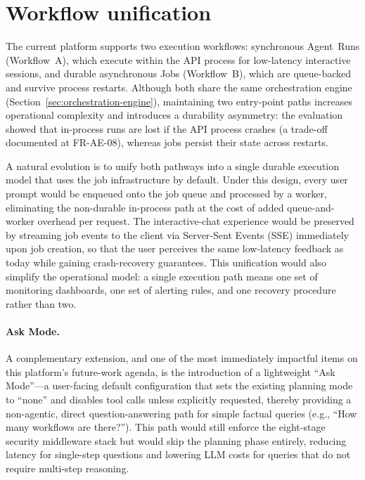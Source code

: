 \documentclass[a4paper,noexaminfo]{sapthesis}
\begin{document}
\section{Workflow unification}
\label{sec:fw-workflow}

The current platform supports two execution workflows: synchronous
Agent~Runs (Workflow~A), which execute within the API process for
low-latency interactive sessions, and durable asynchronous Jobs
(Workflow~B), which are queue-backed and survive process restarts.
Although both share the same orchestration engine
(Section~\ref{sec:orchestration-engine}), maintaining two entry-point
paths increases operational complexity and introduces a durability
asymmetry: the evaluation showed that in-process runs are lost if the API
process crashes (a trade-off documented at FR-AE-08), whereas jobs
persist their state across restarts.

A natural evolution is to unify both pathways into a single durable
execution model that uses the job infrastructure by default.  Under this
design, every user prompt would be enqueued onto the job queue and
processed by a worker, eliminating the non-durable in-process path at
the cost of added queue-and-worker overhead per request.  The
interactive-chat experience would be preserved by streaming job events
to the client via Server-Sent Events (SSE) immediately upon job creation,
so that the user perceives the same low-latency feedback as today while
gaining crash-recovery guarantees.  This unification would also simplify
the operational model: a single execution path means one set of monitoring
dashboards, one set of alerting rules, and one recovery procedure rather
than two.

\paragraph{Ask Mode.}
A complementary extension, and one of the most immediately impactful
items on this platform's future-work agenda, is the introduction of a
lightweight ``Ask Mode''---a user-facing default configuration that sets
the existing planning mode to ``none'' and disables tool calls unless
explicitly requested, thereby providing a non-agentic, direct
question-answering path for simple factual queries (e.g., ``How many
workflows are there?'').  This path would still enforce the eight-stage
security middleware stack but would skip the planning phase entirely,
reducing latency for single-step questions and lowering LLM costs for
queries that do not require multi-step reasoning.
\end{document}
